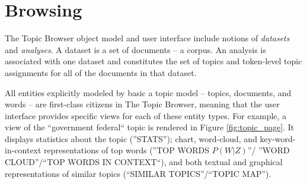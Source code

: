 \documentclass[11pt]{article}
\begin{document}
% 

\section{Browsing}
The Topic Browser object model and user interface include notions of \textit{datasets} and \textit{analyses}.
A dataset is a set of documents -- a corpus. An analysis is associated with one dataset and constitutes the set of topics and token-level topic assignments for
all of the documents in that dataset.

All entities explicitly modeled by basic a topic model -- topics, documents, and
words -- are first-class citizens in The Topic Browser, meaning that the user
interface provides specific views for each of these entity types. For example, a
view of the ``government federal`` topic is rendered in Figure \ref{fig:topic_page}.
It displays statistics about the topic (''STATS''); chart, word-cloud, and
key-word-in-context representations of top words (''TOP WORDS $P(W|Z)$''/
''WORD CLOUD''/``TOP WORDS IN CONTEXT``), and both textual and graphical
representations of similar topics (``SIMILAR TOPICS''/``TOPIC MAP'').
\end{document}

